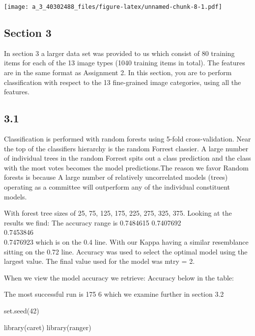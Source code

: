 \documentclass[
]{article}
\newenvironment{Shaded}{\begin{snugshade}}{\end{snugshade}}
\newcommand{\DecValTok}[1]{\textcolor[rgb]{0.00,0.00,0.81}{#1}}
\newcommand{\FunctionTok}[1]{\textcolor[rgb]{0.00,0.00,0.00}{#1}}
\newcommand{\NormalTok}[1]{#1}
\begin{document}
\texttt{[image: a\_3\_40302488\_files/figure-latex/unnamed-chunk-8-1.pdf]}

\hypertarget{section-3-1}{%
\subsection{Section 3}\label{section-3-1}}

In section 3 a larger data set was provided to us which consist of 80
training items for each of the 13 image types (1040 training items in
total). The features are in the same format as Assignment 2. In this
section, you are to perform classification with respect to the 13
fine-grained image categories, using all the features.

\hypertarget{section-6}{%
\subsection{3.1}\label{section-6}}

Classification is performed with random forests using 5-fold
cross-validation. Near the top of the classifiers hierarchy is the
random Forrest classier. A large number of individual trees in the
random Forrest spits out a class prediction and the class with the most
votes becomes the model predictions.The reason we favor Random forests
is because A large number of relatively uncorrelated models (trees)
operating as a committee will outperform any of the individual
constituent models.

With forest tree sizes of 25, 75, 125, 175, 225, 275, 325, 375. Looking
at the results we find: The accuracy range is 0.7484615 0.7407692\\
0.7453846\\
0.7476923 which is on the 0.4 line. With our Kappa having a similar
resemblance sitting on the 0.72 line. Accuracy was used to select the
optimal model using the largest value. The final value used for the
model was mtry = 2.

When we view the model accuracy we retrieve: Accuracy below in the
table:

The most successful run is 175 6 which we examine further in section 3.2

\begin{Shaded}
\begin{Highlighting}[]
\FunctionTok{set.seed}\NormalTok{(}\DecValTok{42}\NormalTok{)}

\FunctionTok{library}\NormalTok{(caret)}
\FunctionTok{library}\NormalTok{(ranger)}
\end{Highlighting}
\end{Shaded}
\end{document}
